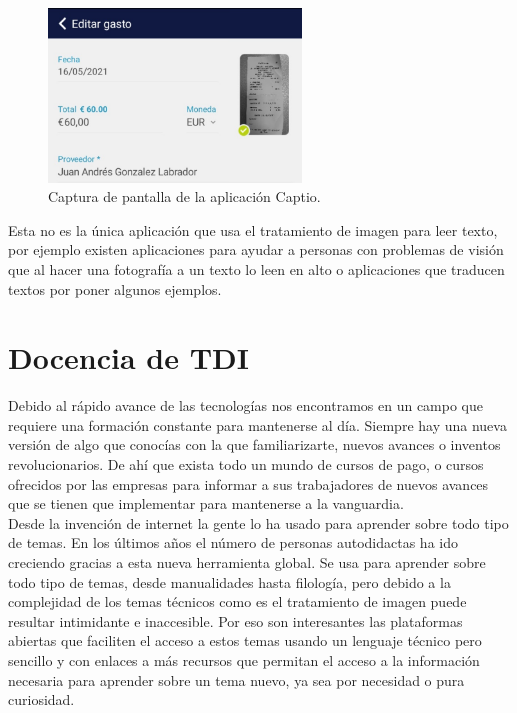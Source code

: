 \begin{itemize}
\begin{figure}[h]
\centering
\includegraphics[width=0.6\textwidth]{imagenes/taxi.PNG}
\caption{Captura de pantalla de la aplicación Captio.}
\label{taxi}
\end{figure}

Esta no es la única aplicación que usa el tratamiento de imagen para leer texto, por ejemplo existen aplicaciones para ayudar a personas con problemas de visión que al hacer una fotografía a un texto lo leen en alto o aplicaciones que traducen textos por poner algunos ejemplos.\\

\end{itemize}

\section{Docencia de TDI}

Debido al rápido avance de las tecnologías nos encontramos en un campo que requiere una formación constante para mantenerse al día. Siempre hay una nueva versión de algo que conocías con la que familiarizarte, nuevos avances o inventos revolucionarios. De ahí que exista todo un mundo de cursos de pago, o cursos ofrecidos por las empresas para informar a sus trabajadores de nuevos avances que se tienen que implementar para mantenerse a la vanguardia.\\

Desde la invención de internet la gente lo ha usado para aprender sobre todo tipo de temas\cite{KUO201435}. En los últimos años el número de personas autodidactas ha ido creciendo gracias a esta nueva herramienta global. Se usa para aprender sobre todo tipo de temas, desde manualidades hasta filología, pero debido a la complejidad de los temas técnicos como es el tratamiento de imagen puede resultar intimidante e inaccesible. Por eso son interesantes las plataformas abiertas que faciliten el acceso a estos temas usando un lenguaje técnico pero sencillo y con enlaces a más recursos que permitan el acceso a la información necesaria para aprender sobre un tema nuevo, ya sea por necesidad o pura curiosidad.\\

